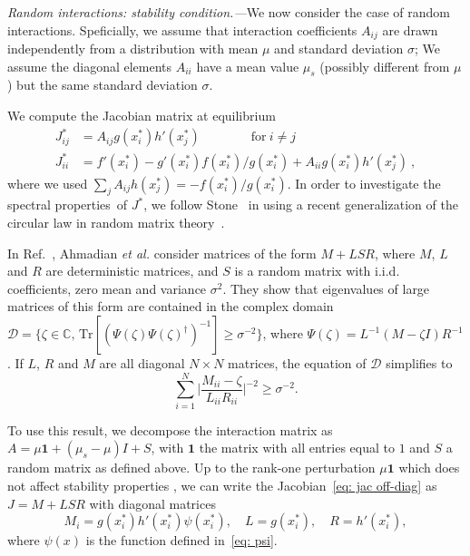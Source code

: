 \emph{Random interactions: stability condition.---}We now consider the case of random interactions.
Speficially, we assume that interaction coefficients $A_{ij}$ are drawn independently from a distribution with mean $\mu$ and standard deviation $\sigma$;
We assume the diagonal elements $A_{ii}$ have a mean value $\mu_s$ (possibly different from $\mu$) but the same standard deviation $\sigma$. 
 
We compute the Jacobian matrix at equilibrium
\begin{align}
    J_{ij}^* & = A_{ij}g(x_i^*)h'(x_j^*) \qquad \qquad \textrm{for} \ i\neq j \label{eq: jac off-diag}\\
    J_{ii}^* & = f'(x_i^*) - g'(x_i^*)f(x_i^*)/g(x_i^*) + A_{ii}g(x_i^*)h'(x_j^*) \ , \label{eq: jac diag}
\end{align}
where we used $\sum_{j}A_{ij}h(x_j^*)=-f(x_i^*)/g(x_i^*)$.
In order to investigate the spectral properties of $J^*$, 
we follow Stone~\cite{Stone2018} in using a recent generalization of the circular law in random matrix theory~\cite{Ahmadian2015}.

In Ref.~\cite{Ahmadian2015}, Ahmadian \emph{et al.} consider matrices of the form $M + LSR$, where $M$,  
$L$ and $R$ are deterministic matrices, and $S$ is a random matrix with i.i.d. coefficients, zero mean and variance $\sigma^2$.
They show that eigenvalues of large matrices of this form are contained in the complex domain $\mathcal{D} = \{\zeta \in \mathbb{C},\, \textrm{Tr}[(\Psi(\zeta) \Psi(\zeta)^\dagger)^{-1}]\geq \sigma^{-2}\}$, where $\Psi(\zeta) = L^{-1}(M-\zeta I)R^{-1}$. If $L$, $R$ and $M$ are all diagonal $N\times N$ matrices, the equation of $\mathcal{D}$ simplifies to 
\begin{equation}
    \sum_{i=1}^N\Big\vert\frac{M_{ii} - \zeta}{L_{ii}R_{ii}}\Big\vert^{-2}\geq \sigma^{-2}.
\label{eq: domain}
\end{equation}

To use this result, we decompose the interaction matrix as $A = \mu\mathbf{1} + (\mu_s-\mu)I + S$,
with $\mathbf{1}$ the matrix with all entries equal to $1$ and $S$ a random matrix as defined above.
Up to the rank-one perturbation $\mu\mathbf{1}$ which does not affect stability properties \cite{Stone2018}, we can write the Jacobian~\eqref{eq: jac off-diag} as $J = M + LSR$ with diagonal matrices
\begin{equation}
    M_i = g(x_i^*)h'(x_i^*)\psi(x_i^*),\quad L = g(x_i^*), \quad R = h'(x_i^*),
\end{equation}
where $\psi(x)$ is the function defined in~\eqref{eq: psi}. 

